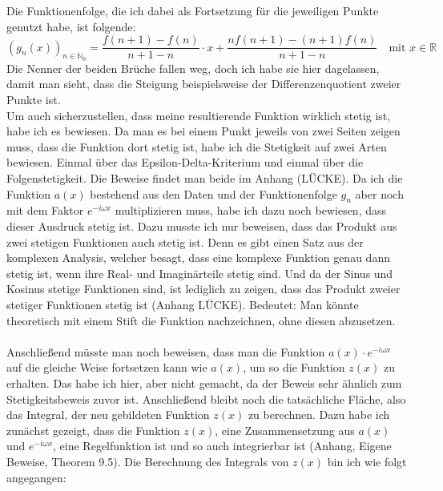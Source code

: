 \documentclass[a4paper,12pt]{article}
\theoremstyle{definition}
\theoremstyle{remark}
\begin{document}
Die Funktionenfolge, die ich dabei als Fortsetzung für die jeweiligen Punkte genutzt habe, ist folgende:
$$\left(g_n(x)\right)_{n\in \mathbb{N}_0} = \frac{f(n+1) - f(n)}{n+1 -n } \cdot x + \frac{nf(n+1) - (n+1)f(n)}{n+1 -n} \quad \text{mit } x\in\mathbb{R} $$
Die Nenner der beiden Brüche fallen weg, doch ich habe sie hier dagelassen, damit man sieht, dass 
die Steigung beispielsweise der Differenzenquotient zweier Punkte ist. 
\\ 
Um auch sicherzustellen, dass meine resultierende Funktion wirklich stetig ist, habe ich es bewiesen. 
Da man es bei einem Punkt jeweils von zwei Seiten zeigen muss, dass die Funktion dort stetig ist, habe ich die 
Stetigkeit auf zwei Arten bewiesen. Einmal über das Epsilon-Delta-Kriterium und einmal über die Folgenstetigkeit. 
Die Beweise findet man beide im Anhang (LÜCKE). Da ich die Funktion $a(x)$ bestehend aus den Daten und der Funktionenfolge $g_n$ 
aber noch mit dem Faktor $e^{-i\omega x}$ multiplizieren muss, habe ich dazu noch bewiesen, dass dieser Ausdruck stetig ist. 
Dazu musste ich nur beweisen, dass das Produkt aus zwei stetigen Funktionen auch stetig ist. Denn es gibt einen 
Satz aus der komplexen Analysis, welcher besagt, dass eine komplexe Funktion genau dann stetig ist, 
wenn ihre Real- und Imaginärteile stetig sind. Und da der Sinus und Kosinus stetige Funktionen sind, 
ist lediglich zu zeigen, dass das Produkt zweier stetiger Funktionen stetig ist (Anhang LÜCKE). Bedeutet: Man könnte 
theoretisch mit einem Stift die Funktion nachzeichnen, ohne diesen abzusetzen. 
\\ \\
Anschließend müsste man noch beweisen, dass man die Funktion $a(x)\cdot e^{-i\omega x}$ auf die gleiche Weise 
fortsetzen kann wie $a(x)$, um so die Funktion $z(x)$ zu erhalten. Das habe ich hier, aber nicht gemacht, da der 
Beweis sehr ähnlich zum Stetigkeitsbeweis zuvor ist. Anschließend bleibt noch die tatsächliche Fläche, also das 
Integral, der neu gebildeten Funktion $z(x)$ zu berechnen. Dazu habe ich zunächst gezeigt, dass die Funktion $z(x)$, eine 
Zusammensetzung aus $a(x)$ und $e^{-i\omega x}$, eine Regelfunktion ist und so auch integrierbar ist (Anhang, Eigene 
Beweise, Theorem 9.5). Die Berechnung des Integrals von $z(x)$ bin ich wie folgt angegangen:
\end{document}
